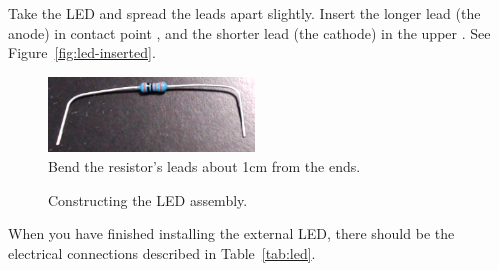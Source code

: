 Take the LED and spread the leads apart slightly.
Insert the longer lead (the anode) in contact point \ledanodecontactpoint, and the shorter lead (the cathode) in the upper \ground.
See Figure~\ref{fig:led-inserted}.

\begin{figure}
    \centering
    \includegraphics[height=2cm]{direct/led/resistor-bent}
    \caption{Bend the resistor's leads about 1cm from the ends.\label{fig:resistor-bent}}
\end{figure}

\begin{figure}
    \centering
    \hfil
    \caption{Constructing the LED assembly.}
\end{figure}

When you have finished installing the external LED, there should be the electrical connections described in Table~\ref{tab:led}.

